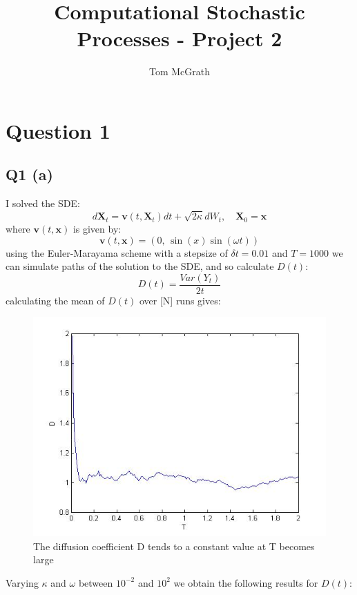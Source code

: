 \documentclass[11pt]{article} %
\title{Computational Stochastic Processes - Project 2}
\author{Tom McGrath}
\begin{document}
\maketitle

\section{Question 1}
\subsection{Q1 (a)}
I solved the SDE:
\[
	d\mathbf{X}_{t} = \mathbf{v}(t, \mathbf{X}_{t})dt + \sqrt{2\kappa}dW_{t}, \quad \mathbf{X}_{0} = \mathbf{x}
\]
where $\mathbf{v}(t,\mathbf{x})$ is given by:
\[
	\mathbf{v}(t,\mathbf{x}) = (0,\,\sin(x)\sin(\omega t))
\]
using the Euler-Marayama scheme with a stepsize of $\delta t = 0.01$ and $T = 1000$ we can simulate paths of the solution to the SDE, and so calculate $D(t)$:
\[
	D(t) = \frac{Var(Y_{t})}{2t}
\]
calculating the mean of $D(t)$ over [N] runs gives:
\begin{figure}
	\centering
		\includegraphics[scale = 0.5]{q1.jpg}
		\caption{The diffusion coefficient D tends to a constant value at T becomes large}
\end{figure}
Varying $\kappa$ and $\omega$ between $10^{-2}$ and $10^{2}$ we obtain the following results  for $D(t)$:
\end{document}

